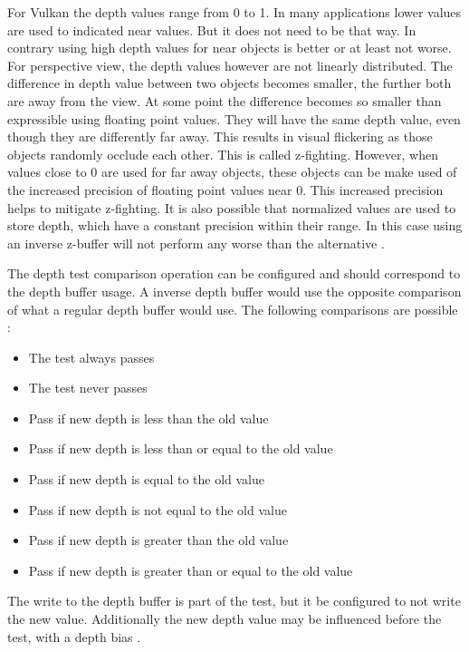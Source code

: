 For Vulkan the depth values range from 0 to 1. In many applications lower values are used to indicated near values. But it does not need to be that way. In contrary using high depth values for near objects is better or at least not worse. For perspective view, the depth values however are not linearly distributed. The difference in depth value between two objects becomes smaller, the further both are away from the view. At some point the difference becomes so smaller than expressible using floating point values. They will have the same depth value, even though they are differently far away. This results in visual flickering as those objects randomly occlude each other. This is called z-fighting. However, when values close to 0 are used for far away objects, these objects can be make used of the increased precision of floating point values near 0. This increased precision helps to mitigate z-fighting. It is also possible that normalized values are used to store depth, which have a constant precision within their range. In this case using an inverse z-buffer will not perform any worse than the alternative \cite{lapidous:1999:optimal, nvidia:inversez}.

The depth test comparison operation can be configured and should correspond to the depth buffer usage. A inverse depth buffer would use the opposite comparison of what a regular depth buffer would use. The following comparisons are possible \cite{sellers:vulkanprogramming}:
\begin{itemize}
	\item The test always passes
	\item The test never passes
	\item Pass if new depth is less than the old value
	\item Pass if new depth is less than or equal to  the old value
	\item Pass if new depth is equal to the old value
	\item Pass if new depth is not equal to the old value
	\item Pass if new depth is greater than the old value
	\item Pass if new depth is greater than or equal to  the old value	
\end{itemize}

The write to the depth buffer is part of the test, but it be configured to not write the new value. Additionally the new depth value may be influenced before the test, with a depth bias \cite{sellers:vulkanprogramming}.

